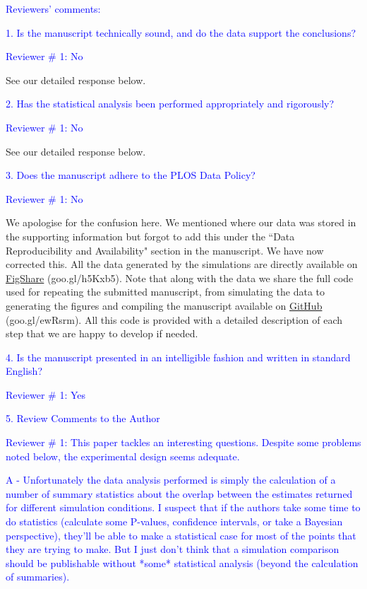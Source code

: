 \documentclass[11pt]{letter}
\begin{document}
\begin{letter}{}
\textcolor{blue}{Reviewers' comments:}

\textcolor{blue}{1. Is the manuscript technically sound, and do the data support the conclusions?}

\textcolor{blue}{Reviewer $\#$ 1: No}

See our detailed response below.

\textcolor{blue}{2. Has the statistical analysis been performed appropriately and rigorously?}

\textcolor{blue}{Reviewer $\#$ 1: No}

See our detailed response below.

\textcolor{blue}{3. Does the manuscript adhere to the PLOS Data Policy?}

\textcolor{blue}{Reviewer $\#$ 1: No}

We apologise for the confusion here. We mentioned where our data was stored in the supporting information but forgot to add this under the ``Data Reproducibility and Availability" section in the manuscript. We have now corrected this. All the data generated by the simulations are directly available on \href{http://figshare.com/articles/Effect_of_missing_data_on_topological_inference_using_a_total_evidence_approach/1306861}{FigShare} (goo.gl/h5Kxb5). Note that along with the data we share the full code used for repeating the submitted manuscript, from simulating the data to generating the figures and compiling the manuscript available on \href{https://github.com/TGuillerme/Total_Evidence_Method-Missing_data}{GitHub} (goo.gl/ewRsrm). All this code is provided with a detailed description of each step that we are happy to develop if needed.

\textcolor{blue}{4. Is the manuscript presented in an intelligible fashion and written in standard English?}

\textcolor{blue}{Reviewer $\#$ 1: Yes}

\textcolor{blue}{5. Review Comments to the Author}

\textcolor{blue}{Reviewer $\#$ 1: This paper tackles an interesting questions. Despite some problems noted below, the experimental design seems adequate.}


\textcolor{blue}{A - Unfortunately the data analysis performed is simply the calculation of a number of summary statistics about the overlap between the estimates returned for different simulation conditions. I suspect that if the authors take some time to do statistics (calculate some P-values, confidence intervals, or take a Bayesian perspective), they'll be able to make a statistical case for most of the points that they are trying to make. But I just don't think that a simulation comparison should be publishable without *some* statistical analysis (beyond the calculation of summaries).}


\end{letter}
\end{document}
